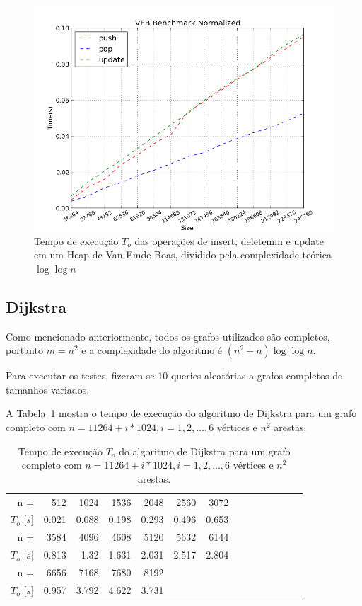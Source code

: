 \documentclass{article}
\begin{document}
\begin{figure}
  \centering
  \includegraphics[width=\textwidth,keepaspectratio]{heap_inv2.png}
  \caption{Tempo de execução $T_o$ das operações de insert, deletemin e update em um Heap de Van Emde Boas, dividido pela complexidade teórica $\log\log n$}
  \label{fig2}
\end{figure}


\subsection{Dijkstra}

Como mencionado anteriormente, todos os grafos utilizados são completos, portanto $m=n^2$ e a complexidade do algoritmo é $(n^2 + n) \log\log n$.

Para executar os testes, fizeram-se 10 queries aleatórias a grafos completos de tamanhos variados.

A Tabela~\ref{tab1} mostra o tempo de execução do algoritmo de Dijkstra para um grafo completo com $n=11264 + i * 1024, i = 1, 2, \ldots, 6$ vértices e $n ^ 2$ arestas.


\begin{table}
  \centering
  \begin{tabular}{rrrrrrrrrrrrrr}
    \hline
    n =             & 512  & 1024 & 1536 & 2048 & 2560 & 3072        \\
    $T_o$ [$s$]     & 0.021 & 0.088 & 0.198 & 0.293 & 0.496 & 0.653     \\
    \hline
    n =             & 3584 & 4096  & 4608 & 5120  & 5632  & 6144  \\
    $T_o$ [$s$]     & 0.813 & 1.32  & 1.631 & 2.031 & 2.517 & 2.804 \\
    \hline
    n =             & 6656  & 7168  & 7680  & 8192  \\
    $T_o$ [$s$]     & 0.957 & 3.792 & 4.622 & 3.731 \\
    \hline
  \end{tabular}
  \caption{Tempo de execução $T_o$ do algoritmo de Dijkstra para um grafo completo com $n=11264 + i * 1024, i = 1, 2, \ldots, 6$ vértices e $n ^ 2$ arestas.}
  \label{tab1}
\end{table}
\end{document}
